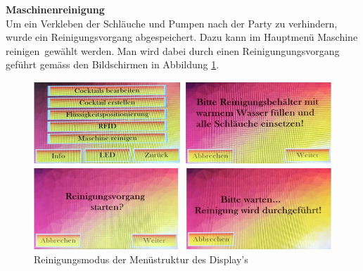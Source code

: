 \textbf{Maschinenreinigung}\\
Um ein Verkleben der Schläuche und Pumpen nach der Party zu verhindern, wurde ein Reinigungsvorgang abgespeichert. Dazu kann im Hauptmenü \flqq Maschine reinigen\frqq~gewählt werden. Man wird dabei durch einen Reinigungungsvorgang geführt gemäss den Bildschirmen in Abbildung \ref{fig:DisplayReinigen}.

\begin{figure}[H]
	\centering
	\includegraphics[width=\textwidth]{graphics/DisplayReinigen}
	\caption{Reinigungsmodus der Menüstruktur des Display's}
	\label{fig:DisplayReinigen}
\end{figure}

\newpage


